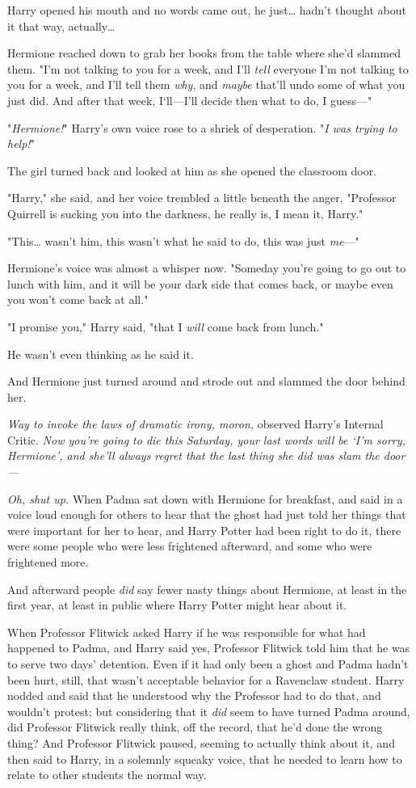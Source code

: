 Harry opened his mouth and no words came out, he just{\ldots} hadn't thought
about it that way, actually{\ldots}

Hermione reached down to grab her books from the table where she'd slammed
them. "I'm not talking to you for a week, and I'll \emph{tell} everyone I'm not
talking to you for a week, and I'll tell them \emph{why}, and \emph{maybe}
that'll undo some of what you just did. And after that week, I`ll---I'll decide
then what to do, I guess---"

"\emph{Hermione!}" Harry's own voice rose to a shriek of desperation. "\emph{I
was trying to help!}"

The girl turned back and looked at him as she opened the classroom door.

"Harry," she said, and her voice trembled a little beneath the anger,
"Professor Quirrell is sucking you into the darkness, he really is, I mean it,
Harry."

"This{\ldots} wasn't him, this wasn't what he said to do, this was just
\emph{me}---"

Hermione's voice was almost a whisper now. "Someday you're going to go out to
lunch with him, and it will be your dark side that comes back, or maybe even
you won't come back at all."

"I promise you," Harry said, "that I \emph{will} come back from lunch."

He wasn't even thinking as he said it.

And Hermione just turned around and strode out and slammed the door behind her.

\emph{Way to invoke the laws of dramatic irony, moron,} observed Harry's
Internal Critic. \emph{Now you're going to die this Saturday, your last words
will be `I'm sorry, Hermione', and she'll always regret that the last thing she
did was slam the door---}

\emph{Oh, shut up.}
\later
When Padma sat down with Hermione for breakfast, and said in a voice loud
enough for others to hear that the ghost had just told her things that were
important for her to hear, and Harry Potter had been right to do it, there were
some people who were less frightened afterward, and some who were frightened
more.

And afterward people \emph{did} say fewer nasty things about Hermione, at least
in the first year, at least in public where Harry Potter might hear about it.

When Professor Flitwick asked Harry if he was responsible for what had happened
to Padma, and Harry said yes, Professor Flitwick told him that he was to serve
two days' detention. Even if it had only been a ghost and Padma hadn't been
hurt, still, that wasn't acceptable behavior for a Ravenclaw student. Harry
nodded and said that he understood why the Professor had to do that, and
wouldn't protest; but considering that it \emph{did} seem to have turned Padma
around, did Professor Flitwick really think, off the record, that he'd done the
wrong thing? And Professor Flitwick paused, seeming to actually think about it,
and then said to Harry, in a solemnly squeaky voice, that he needed to learn
how to relate to other students the normal way.

